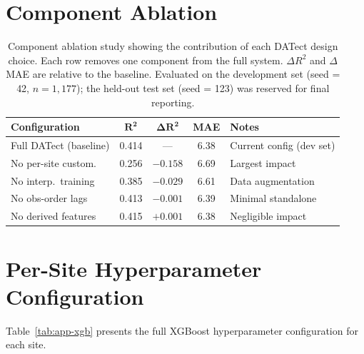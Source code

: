 \documentclass[toxins,article,submit,moreauthors]{Definitions/mdpi}
\begin{document}
\section{Component Ablation}
\label{app:component-ablation}

\begin{table}[H]
\caption{Component ablation study showing the contribution of each DATect design choice. Each row removes one component from the full system. $\Delta R^2$ and $\Delta$MAE are relative to the baseline. Evaluated on the development set (seed = 42, $n = 1{,}177$); the held-out test set (seed = 123) was reserved for final reporting.}
\label{tab:ablation}
\centering\footnotesize
\begin{tabularx}{\linewidth}{lcccX}
\toprule
\textbf{Configuration} & $\boldsymbol{R^2}$ & $\boldsymbol{\Delta R^2}$ & \textbf{MAE} & \textbf{Notes} \\
\midrule
Full DATect (baseline)    & 0.414 & ---      & 6.38 & Current config (dev set) \\
No per-site custom.       & 0.256 & $-0.158$ & 6.69 & Largest impact \\
No interp.\ training      & 0.385 & $-0.029$ & 6.61 & Data augmentation \\
No obs-order lags         & 0.413 & $-0.001$ & 6.39 & Minimal standalone \\
No derived features       & 0.415 & $+0.001$ & 6.38 & Negligible impact \\
\bottomrule
\end{tabularx}
\end{table}

\section{Per-Site Hyperparameter Configuration}
\label{app:hyperparams}

Table~\ref{tab:app-xgb} presents the full XGBoost hyperparameter configuration for each site.
\end{document}
